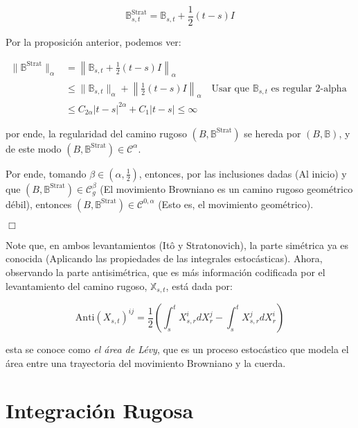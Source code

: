 \[
	\mathbb{B}_{s,t}^{\text{Strat}} = \mathbb{B}_{s,t} + \frac{1}{2} (t - s) I
\]

Por la proposición anterior, podemos ver:

\begin{align*}
	\lVert  \mathbb{B}^{\text{Strat}} \rVert_{\alpha} &= \left\lVert \mathbb{B}_{s,t} + \frac{1}{2} (t - s) I \right\rVert_{ \alpha } \\
	&\leq \lVert \mathbb{B}_{s,t} \rVert_{\alpha} + \left\lVert \frac{1}{2}(t-s)I \right\rVert_{\alpha} \quad \text{Usar que } \mathbb{B}_{s,t} \text{ es regular 2-alpha } \\
	&\leq C_{2\alpha} \lvert t - s \rvert^{2\alpha} + C_{1} \lvert t - s \rvert \leq \infty
\end{align*}

por ende, la regularidad del camino rugoso $(B, \mathbb{B}^{\text{Strat}})$ se hereda por $(B, \mathbb{B})$, y de este modo $(B, \mathbb{B}^{\text{Strat}}) \in \mathcal{C}^{\alpha}$.

Por ende, tomando $\beta \in \left( \alpha, \frac{1}{2} \right)$, entonces, por las inclusiones dadas (Al inicio) y que $(B, \mathbb{B}^{\text{Strat}}) \in \mathcal{C}_g^{\beta}$ (El movimiento Browniano es un camino rugoso geométrico débil), entonces $(B, \mathbb{B}^{\text{Strat}}) \in \mathcal{C}^{0,\alpha}$ (Esto es, el movimiento geométrico).

\begin{flushright}
	$\Box$
\end{flushright}


Note que, en ambos levantamientos (Itô y Stratonovich), la parte simétrica ya es conocida (Aplicando las propiedades de las integrales estocásticas). Ahora, observando la parte antisimétrica, que es más información codificada por el levantamiento del camino rugoso, $\mathbb{X}_{s,t}$, está dada por:

\[
	\text{Anti}(X_{s,t})^{ij} = \frac{1}{2} \left( \int_s^t X_{s,r}^i dX_r^j - \int_s^t X_{s,r}^j dX^i_r \right)
\]

esta se conoce como \textit{el área de Lévy}, que es un proceso estocástico que modela el área entre una trayectoria del movimiento Browniano y la cuerda.




\section{Integración Rugosa}




